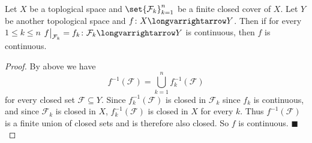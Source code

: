 \documentclass[10pt]{article}
\def\qed{\hskip1cm\penalty-100\hbox{}\hfill$\blacksquare$}
\def\mF{\mathcal{F}}
\def\longto{\longvarrightarrow}
\begin{document}
\begin{thrm*}

    Let $X$ be a toplogical space and $\set{\mF_k}_{k=1}^n$ be a finite closed cover of $X$.
    Let $Y$ be another topological space and $f\colon X\longto Y$.
    Then if for every $1\leq k\leq n$ $f\bigr|_{\mF_k}=f_k\colon\mF_k\longto Y$ is continuous, then $f$ is continuous.

\end{thrm*}

\begin{proof}

    By above we have
    \[ f^{-1}(\mF) = \bigcup_{k=1}^n f_k^{-1}(\mF) \]
    for every closed set $\mF\subseteq Y$.
    Since $f_k^{-1}(\mF)$ is closed in $\mF_k$ since $f_k$ is continuous, and since $\mF_k$ is closed in $X$, $f_k^{-1}(\mF)$ is closed in $X$ for every $k$.
    Thus $f^{-1}(\mF)$ is a finite union of closed sets and is therefore also closed.
    So $f$ is continuous.
    \qed

\end{proof}
\end{document}
